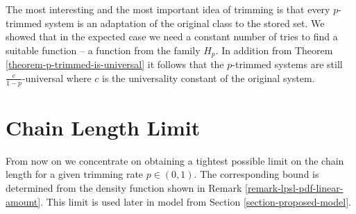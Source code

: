 The most interesting and the most important idea of trimming is that every $p$-trimmed system is an adaptation of the original class to the stored set. We showed that in the expected case we need a constant number of tries to find a suitable function -- a function from the family $H_p$. In addition from Theorem \ref{theorem-p-trimmed-is-universal} it follows that the $p$-trimmed systems are still $\frac{c}{1 - p}$-universal where $c$ is the universality constant of the original system.

\section{Chain Length Limit}
\label{section-linear-systems-linear-amount-constant-estimate}
From now on we concentrate on obtaining a tightest possible limit on the chain length for a given trimming rate $p \in (0, 1)$. The corresponding bound is determined from the density function shown in Remark \ref{remark-lpsl-pdf-linear-amount}. This limit is used later in model from Section \ref{section-proposed-model}.

